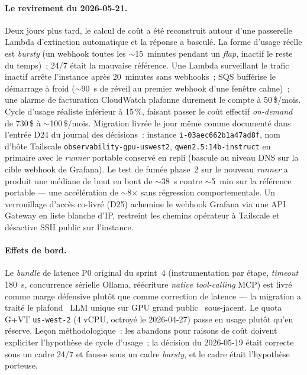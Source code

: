\documentclass[11pt,a4paper,oneside]{report}
\begin{document}
\paragraph{Le revirement du 2026-05-21.}
Deux jours plus tard, le calcul de coût a été reconstruit autour
d'une passerelle Lambda d'extinction automatique et la réponse a
basculé. La forme d'usage réelle est \emph{bursty} (un webhook
toutes les $\sim$15~minutes pendant un \emph{flap}, inactif le
reste du temps)~; 24/7 était la mauvaise référence. Une Lambda
surveillant le trafic inactif arrête l'instance après 20~minutes
sans webhooks~; SQS bufférise le démarrage à froid ($\sim$90~s de
réveil au premier webhook d'une fenêtre calme)~; une alarme de
facturation CloudWatch plafonne durement le compte à 50\,\$/mois.
Cycle d'usage réaliste inférieur à 15\,\%, faisant passer le coût
effectif \emph{on-demand} de 730\,\$ à $\sim$100\,\$/mois.
Migration livrée le jour même comme documenté dans l'entrée D24 du
journal des décisions~: instance \texttt{i-03aec662b1a47ad8f}, nom
d'hôte Tailscale \texttt{observability-gpu-uswest2},
\texttt{qwen2.5:14b-instruct} en primaire avec le \emph{runner}
portable conservé en repli (bascule au niveau DNS sur la cible
webhook de Grafana). Le test de fumée phase~2 sur le nouveau
\emph{runner} a produit une médiane de bout en bout de $\sim$38~s
contre $\sim$5~min sur la référence portable --- une accélération
de $\sim$8$\times$ sans régression comportementale. Un
verrouillage d'accès co-livré (D25) achemine le webhook Grafana
via une API Gateway en liste blanche d'IP, restreint les chemins
opérateur à Tailscale et désactive SSH public sur l'instance.

\paragraph{Effets de bord.}
Le \emph{bundle} de latence P0 original du sprint~4
(instrumentation par étape, \emph{timeout} 180~s, concurrence
sérielle Ollama, réécriture \emph{native tool-calling} MCP) est
livré comme marge défensive plutôt que comme correction de
latence --- la migration a traité le plafond \og~LLM unique sur
GPU grand public~\fg{} sous-jacent. Le quota G+VT
\texttt{us-west-2} (4 vCPU, octroyé le 2026-04-27) passe en usage
plutôt qu'en réserve. Leçon méthodologique~: les abandons pour
raisons de coût doivent expliciter l'hypothèse de cycle d'usage~;
la décision du 2026-05-19 était correcte sous un cadre 24/7 et
fausse sous un cadre \emph{bursty}, et le cadre était l'hypothèse
porteuse.
\end{document}
